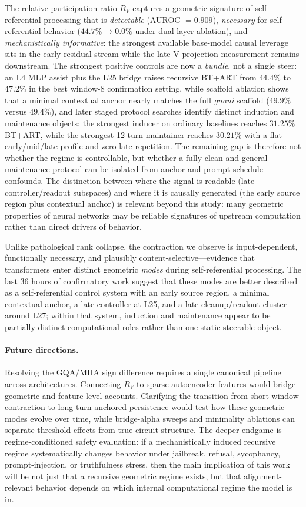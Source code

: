 \documentclass{article}
\newcommand{\RV}{R_V}
\begin{document}
The relative participation ratio $\RV$ captures a geometric signature of self-referential
processing that is \emph{detectable} (AUROC $= 0.909$),
\emph{necessary} for self-referential behavior ($44.7\% \to 0.0\%$ under dual-layer ablation),
and \emph{mechanistically informative}: the strongest available base-model causal leverage sits in
the early residual stream while the late V-projection measurement remains downstream.
The strongest positive controls are now a \emph{bundle}, not a single steer:
an L4 MLP assist plus the L25 bridge raises recursive BT+ART from $44.4\%$ to $47.2\%$ in the
best window-8 confirmation setting, while scaffold ablation shows that a minimal contextual anchor
nearly matches the full \emph{gnani} scaffold ($49.9\%$ versus $49.4\%$), and
later staged protocol searches identify distinct induction and maintenance objects:
the strongest inducer on ordinary baselines reaches $31.25\%$ BT+ART, while the strongest
12-turn maintainer reaches $30.21\%$ with a flat early/mid/late profile and zero late repetition.
The remaining gap is therefore not whether the regime is controllable, but whether a fully clean
and general maintenance protocol can be isolated from anchor and prompt-schedule confounds.
The distinction between where the signal is readable (late controller/readout subspaces) and where
it is causally generated (the early source region plus contextual anchor) is relevant beyond this
study: many geometric properties of neural networks may be reliable signatures of upstream
computation rather than direct drivers of behavior.

Unlike pathological rank collapse, the contraction we observe is input-dependent, functionally
necessary, and plausibly content-selective---evidence that transformers enter distinct geometric
\emph{modes} during self-referential processing.
The last 36 hours of confirmatory work suggest that these modes are better described as a
self-referential control system with an early source region, a minimal contextual anchor, a late
controller at L25, and a late cleanup/readout cluster around L27; within that system, induction and
maintenance appear to be partially distinct computational roles rather than one static steerable
object.

\paragraph{Future directions.}
Resolving the GQA/MHA sign difference requires a single canonical pipeline across architectures.
Connecting $\RV$ to sparse autoencoder features would bridge geometric and feature-level
accounts.
Clarifying the transition from short-window contraction to long-turn anchored persistence would test
how these geometric modes evolve over time, while bridge-alpha sweeps and minimality ablations can
separate threshold effects from true circuit structure.
The deeper endgame is regime-conditioned safety evaluation:
if a mechanistically induced recursive regime systematically changes behavior under jailbreak,
refusal, sycophancy, prompt-injection, or truthfulness stress, then the main implication of this
work will be not just that a recursive geometric regime exists, but that alignment-relevant
behavior depends on which internal computational regime the model is in.
\end{document}
